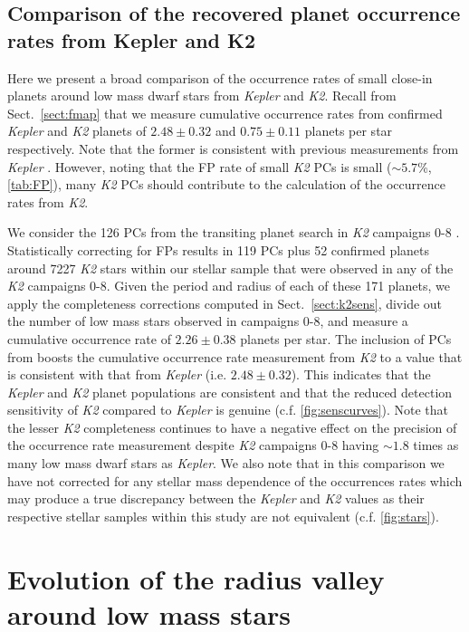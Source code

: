 \documentclass[twocolumn]{emulateapj}
\newcommand{\kepler}[1]{\emph{Kepler}#1}
\newcommand{\ktwo}[1]{\emph{K2}#1}
\begin{document}
\subsection{Comparison of the recovered planet occurrence rates from Kepler and K2} \label{sect:comparef}
Here we present a broad comparison of the occurrence rates of small close-in planets around
low mass dwarf stars from \kepler{} and \ktwo{.} Recall from Sect.~\ref{sect:fmap} that
we measure cumulative occurrence rates from confirmed \kepler{} and \ktwo{} planets of 
$2.48\pm 0.32$ and $0.75\pm 0.11$ planets per star respectively. Note that the former is consistent with
previous measurements from \kepler{} \citep{morton14,dressing15a,gaidos16}. However, noting that 
the FP rate of small \ktwo{} PCs is small ($\sim 5.7$\%, \autoref{tab:FP}), many \ktwo{} PCs should contribute
to the calculation of the occurrence rates from \ktwo{.}


We consider the 126 PCs from the transiting planet search in \ktwo{} campaigns 0-8 \citep{kruse19}.
Statistically correcting
for FPs results in 119 PCs plus 52 confirmed planets around 7227 \ktwo{} stars within our stellar sample that
were observed in any of the \ktwo{} campaigns 0-8. Given the period and radius of each of these 171 planets,
we apply the completeness corrections computed in Sect.~\ref{sect:k2sens}, divide out the number of low mass stars
observed in campaigns 0-8, and measure a cumulative occurrence rate of $2.26\pm 0.38$ planets per star. The inclusion
of PCs from \cite{kruse19} boosts the cumulative occurrence rate measurement from \ktwo{} to a value that is
consistent with that from \kepler{} (i.e. $2.48\pm 0.32$). This indicates that the \kepler{} and
\ktwo{} planet populations are consistent and that the reduced detection sensitivity of \ktwo{} compared to
\kepler{} is genuine (c.f. \autoref{fig:senscurves}). Note that the lesser \ktwo{} completeness continues to
have a negative
effect on the precision of the occurrence rate measurement despite \ktwo{} campaigns 0-8 having $\sim 1.8$ times
as many low mass dwarf stars as \kepler{.} We also note that in this comparison we have not corrected for any stellar
mass dependence of the occurrences rates which may produce a true discrepancy between the \kepler{} and \ktwo{}
values as their respective stellar samples within this study are not equivalent (c.f. \autoref{fig:stars}).  

\section{Evolution of the radius valley around low mass stars} \label{sect:models}
\end{document}
